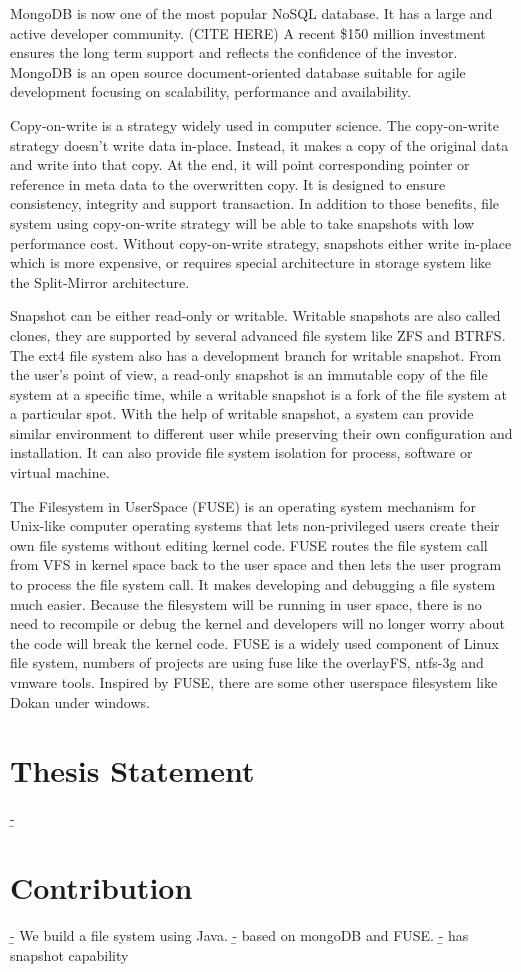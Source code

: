     MongoDB is now one of the most popular NoSQL database. It has a large and active developer community. (CITE HERE)\cite{rsync_alg} A recent \$150 million investment ensures the long term support and reflects the confidence of the investor. MongoDB is an open source document-oriented database suitable for agile development focusing on scalability, performance and availability.

    Copy-on-write is a strategy widely used in computer science. The copy-on-write strategy doesn't write data in-place. Instead, it makes a copy of the original data and write into that copy. At the end, it will point corresponding pointer or reference in meta data to the overwritten copy. It is designed to ensure consistency, integrity and support transaction. In addition to those benefits, file system using copy-on-write strategy will be able to take snapshots with low performance cost. Without copy-on-write strategy, snapshots either write in-place which is more expensive, or requires special architecture in storage system like the Split-Mirror architecture.

    Snapshot can be either read-only or writable. Writable snapshots are also called clones, they are supported by several advanced file system like ZFS and BTRFS. The ext4 file system also has a development branch for writable snapshot. From the user’s point of view, a read-only snapshot is an immutable copy of the file system at a specific time, while a writable snapshot is a fork of the file system at a particular spot. With the help of writable snapshot, a system can provide similar environment to different user while preserving their own configuration and installation. It can also provide file system isolation for process, software or virtual machine.

    The Filesystem in UserSpace (FUSE) is an operating system mechanism for Unix-like computer operating systems that lets non-privileged users create their own file systems without editing kernel code. FUSE routes the file system call from VFS in kernel space back to the user space and then lets the user program to process the file system call. It makes developing and debugging a file system much easier. Because the filesystem will be running in user space, there is no need to recompile or debug the kernel and developers will no longer worry about the code will break the kernel code. FUSE is a widely used component of Linux file system, numbers of projects are using fuse like the overlayFS, ntfs-3g and vmware tools. Inspired by FUSE, there are some other userspace filesystem like Dokan under windows.

\section{Thesis Statement}
   \b{-} 
\section{Contribution}
   \b{- We build a file system using Java.}
   \b{- based on mongoDB and FUSE.}
   \b{- has snapshot capability}
